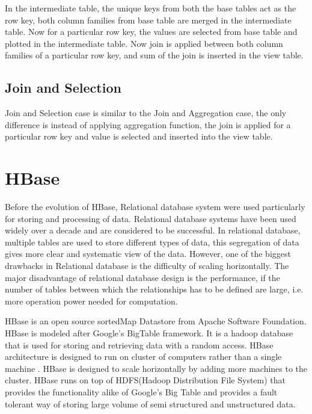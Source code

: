 \documentclass[11pt,a4paper,bibtotoc,idxtotoc,headsepline,footsepline,footexclude,BCOR12mm,DIV13]{scrbook}
\begin{document}
In the intermediate table, the unique keys from both the base tables act as the row key, both column families from base table are merged in the intermediate table. Now for a particular row key, the values are selected from base table and plotted in the intermediate table. Now join is applied between both column families of a particular row key, and sum of the join is inserted in the view table.  


\subsection{Join and Selection}
Join and Selection case is similar to the Join and Aggregation case, the only difference is instead of applying aggregation function, the join is applied for a particular row key and value is selected and inserted into the view table.

\newpage
\section{HBase}
\label{sec:hbase}

Before the evolution of HBase, Relational database system were used particularly for storing and processing of data. Relational database systems have been used widely over a decade and are considered to be successful. In relational database, multiple tables are used to store different types of data, this segregation of data gives more clear and systematic view of the data\cite{relational:dbs}. However, one of the biggest drawbacks in Relational database is the difficulty of scaling horizontally. The major disadvantage of relational database design is the performance, if the number of tables between which the relationships has to be defined are large, i.e. more operation power needed for computation\cite{relational:dbs}. 

HBase is an open source sortedMap Datastore from Apache Software Foundation. HBase is modeled after Google's BigTable framework. It is a hadoop database that is used for storing and retrieving data with a random access. HBase architecture is designed to run on cluster of computers rather than a single machine \cite{coprocessor:detail}. HBase is designed to scale horizontally by adding more machines to the cluster. HBase runs on top of HDFS(Hadoop Distribution File System) that provides the functionality alike of Google's Big Table and provides a fault tolerant way of storing large volume of semi structured and unstructured data\cite{bigdata:analysis}.
\end{document}
